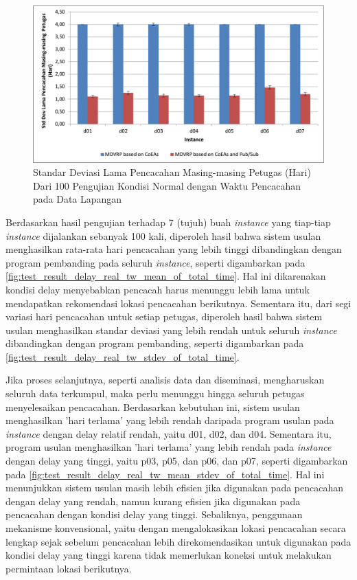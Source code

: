 \begin{figure}[!]
	\centering
	\includegraphics[width=\textwidth]{Resources/Images/test_result_delay_real_tw_stdev_of_total_time}
	\captionsetup{format=hang}
	\caption{Standar Deviasi Lama Pencacahan Masing-masing Petugas (Hari) Dari 100 Pengujian Kondisi Normal dengan Waktu Pencacahan pada Data Lapangan}
	\label{fig:test_result_delay_real_tw_stdev_of_total_time}
\end{figure}


Berdasarkan hasil pengujian terhadap 7 (tujuh) buah \textit{instance} yang tiap-tiap \textit{instance} dijalankan sebanyak 100 kali, diperoleh hasil bahwa sistem usulan menghasilkan rata-rata hari pencacahan yang lebih tinggi dibandingkan dengan program pembanding pada seluruh \textit{instance}, seperti digambarkan pada \autoref{fig:test_result_delay_real_tw_mean_of_total_time}. Hal ini dikarenakan kondisi delay menyebabkan pencacah harus menunggu lebih lama untuk mendapatkan rekomendasi lokasi pencacahan berikutnya. Sementara itu, dari segi variasi hari pencacahan untuk setiap petugas, diperoleh hasil bahwa sistem usulan menghasilkan standar deviasi yang lebih rendah untuk seluruh \textit{instance} dibandingkan dengan program pembanding, seperti digambarkan pada \autoref{fig:test_result_delay_real_tw_stdev_of_total_time}.


Jika proses selanjutnya, seperti analisis data dan diseminasi, mengharuskan seluruh data terkumpul, maka perlu menunggu hingga seluruh petugas menyelesaikan pencacahan. Berdasarkan kebutuhan ini, sistem usulan menghasilkan 'hari terlama' yang lebih rendah daripada program usulan pada \textit{instance} dengan delay relatif rendah, yaitu d01, d02, dan d04. Sementara itu, program usulan menghasilkan 'hari terlama' yang lebih rendah pada \textit{instance} dengan delay yang tinggi, yaitu p03, p05, dan p06, dan p07, seperti digambarkan pada \autoref{fig:test_result_delay_real_tw_mean_stdev_of_total_time}. Hal ini menunjukkan sistem usulan masih lebih efisien jika digunakan pada pencacahan dengan delay yang rendah, namun kurang efisien jika digunakan pada pencacahan dengan kondisi delay yang tinggi. Sebaliknya, penggunaan mekanisme konvensional, yaitu dengan mengalokasikan lokasi pencacahan secara lengkap sejak sebelum pencacahan lebih direkomendasikan untuk digunakan pada kondisi delay yang tinggi karena tidak memerlukan koneksi untuk melakukan permintaan lokasi berikutnya.


